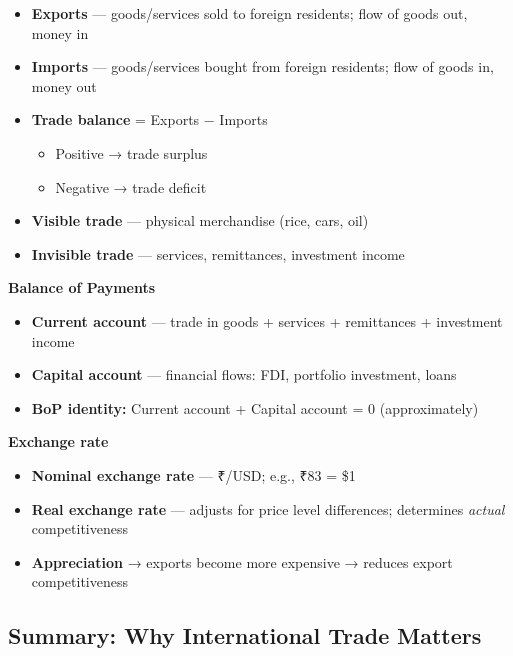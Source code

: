 \documentclass[
  letterpaper,
  DIV=11,
  numbers=noendperiod]{scrartcl}
\providecommand{\tightlist}{%
  \setlength{\itemsep}{0pt}\setlength{\parskip}{0pt}}
\begin{document}
\begin{itemize}
\tightlist
\item
  \textbf{Exports} --- goods/services sold to foreign residents; flow of
  goods out, money in
\item
  \textbf{Imports} --- goods/services bought from foreign residents;
  flow of goods in, money out
\item
  \textbf{Trade balance} = Exports − Imports

  \begin{itemize}
  \tightlist
  \item
    Positive → trade surplus
  \item
    Negative → trade deficit
  \end{itemize}
\item
  \textbf{Visible trade} --- physical merchandise (rice, cars, oil)
\item
  \textbf{Invisible trade} --- services, remittances, investment income
\end{itemize}

\textbf{Balance of Payments}

\begin{itemize}
\tightlist
\item
  \textbf{Current account} --- trade in goods + services + remittances +
  investment income
\item
  \textbf{Capital account} --- financial flows: FDI, portfolio
  investment, loans
\item
  \textbf{BoP identity:} Current account + Capital account = 0
  (approximately)
\end{itemize}

\textbf{Exchange rate}

\begin{itemize}
\tightlist
\item
  \textbf{Nominal exchange rate} --- ₹/USD; e.g., ₹83 = \$1
\item
  \textbf{Real exchange rate} --- adjusts for price level differences;
  determines \emph{actual} competitiveness
\item
  \textbf{Appreciation} → exports become more expensive → reduces export
  competitiveness
\end{itemize}

\subsection{Summary: Why International Trade
Matters}\label{summary-why-international-trade-matters}
\end{document}
